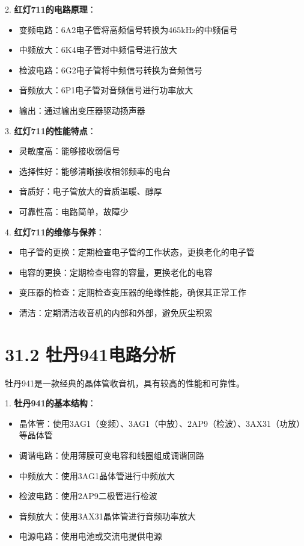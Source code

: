 \documentclass[12pt,UTF8]{ctexbook}
\begin{document}
2. \textbf{红灯711的电路原理}：
   \begin{itemize}[leftmargin=3.5em]
   \item 变频电路：6A2电子管将高频信号转换为465kHz的中频信号
   \item 中频放大：6K4电子管对中频信号进行放大
   \item 检波电路：6G2电子管将中频信号转换为音频信号
   \item 音频放大：6P1电子管对音频信号进行功率放大
   \item 输出：通过输出变压器驱动扬声器
   \end{itemize}

3. \textbf{红灯711的性能特点}：
   \begin{itemize}[leftmargin=3.5em]
   \item 灵敏度高：能够接收弱信号
   \item 选择性好：能够清晰接收相邻频率的电台
   \item 音质好：电子管放大的音质温暖、醇厚
   \item 可靠性高：电路简单，故障少
   \end{itemize}

4. \textbf{红灯711的维修与保养}：
   \begin{itemize}[leftmargin=3.5em]
   \item 电子管的更换：定期检查电子管的工作状态，更换老化的电子管
   \item 电容的更换：定期检查电容的容量，更换老化的电容
   \item 变压器的检查：定期检查变压器的绝缘性能，确保其正常工作
   \item 清洁：定期清洁收音机的内部和外部，避免灰尘积累
   \end{itemize}

\section*{31.2 牡丹941电路分析}

牡丹941是一款经典的晶体管收音机，具有较高的性能和可靠性。

1. \textbf{牡丹941的基本结构}：
   \begin{itemize}[leftmargin=3.5em]
   \item 晶体管：使用3AG1（变频）、3AG1（中放）、2AP9（检波）、3AX31（功放）等晶体管
   \item 调谐电路：使用薄膜可变电容和线圈组成调谐回路
   \item 中频放大：使用3AG1晶体管进行中频放大
   \item 检波电路：使用2AP9二极管进行检波
   \item 音频放大：使用3AX31晶体管进行音频功率放大
   \item 电源电路：使用电池或交流电提供电源
   \end{itemize}
\end{document}

